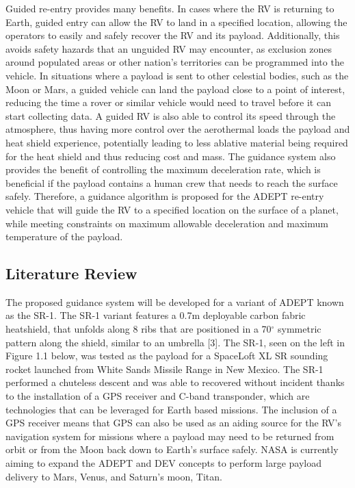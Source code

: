 \documentclass[12pt]{article}
\numberwithin{equation}{section}
\numberwithin{figure}{section}
\numberwithin{table}{section}
\begin{document}
Guided re-entry provides many benefits. In cases where the RV is returning to Earth, guided entry can allow the RV to land in a specified location, allowing the operators to easily and safely recover the RV and its payload. Additionally, this avoids safety hazards that an unguided RV may encounter, as exclusion zones around populated areas or other nation's territories can be programmed into the vehicle. In situations where a payload is sent to other celestial bodies, such as the Moon or Mars, a guided vehicle can land the payload close to a point of interest, reducing the time a rover or similar vehicle would need to travel before it can start collecting data. A guided RV is also able to control its speed through the atmosphere, thus having more control over the aerothermal loads the payload and heat shield experience, potentially leading to less ablative material being required for the heat shield and thus reducing cost and mass. The guidance system also provides the benefit of controlling the maximum deceleration rate, which is beneficial if the payload contains a human crew that needs to reach the surface safely. Therefore, a guidance algorithm is proposed for the ADEPT re-entry vehicle that will guide the RV to a specified location on the surface of a planet, while meeting constraints on maximum allowable deceleration and maximum temperature of the payload.

\subsection{Literature Review}
The proposed guidance system will be developed for a variant of ADEPT known as the SR-1. The SR-1 variant features a 0.7m deployable carbon fabric heatshield, that unfolds along 8 ribs that are positioned in a 70$^\circ$ symmetric pattern along the shield, similar to an umbrella [3]. The SR-1, seen on the left in Figure 1.1 below, was tested as the payload for a SpaceLoft XL SR sounding rocket launched from White Sands Missile Range in New Mexico. The SR-1 performed a chuteless descent and was able to recovered without incident thanks to the installation of a GPS receiver and C-band transponder, which are technologies that can be leveraged for Earth based missions. The inclusion of a GPS receiver means that GPS can also be used as an aiding source for the RV's navigation system for missions where a payload may need to be returned from orbit or from the Moon back down to Earth's surface safely. NASA is currently aiming to expand the ADEPT and DEV concepts to perform large payload delivery to Mars, Venus, and Saturn's moon, Titan.
\end{document}
